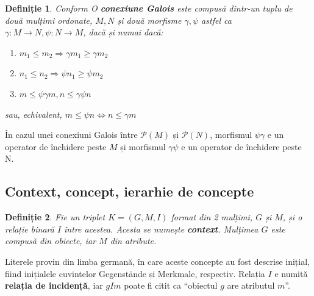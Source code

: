 \documentclass[12pt, a4paper, twoside, romanian]{teza-upb}
\newtheorem{defn}{Definiție}
\begin{document}
    \begin{defn}
      Conform \cite{Carpineto:2004:CDA:975252} O \textbf{conexiune Galois} este compusă dintr-un tuplu de două mulțimi ordonate, $M, N$ și două morfisme $\gamma, \psi$ astfel ca $ \gamma: M \rightarrow N, \psi : N \rightarrow M$, dacă și numai dacă:
    \begin{enumerate}
      \item $m_1 \le m_2 \Rightarrow  \gamma m_1 \ge \gamma m_2$
      \item $n_1 \le n_2 \Rightarrow \psi n_1 \ge \psi m_2$
      \item $m \le \psi \gamma m,  n \le \gamma\psi n $
    \end{enumerate}
    sau, echivalent, $m \le \psi n \Leftrightarrow n \le \gamma m$
    \end{defn}

    În cazul unei conexiuni Galois între $\mathcal{P}(M)$ și $\mathcal{P}(N)$, morfismul $\psi\gamma$ e un operator de închidere peste $M$ și morfismul $\gamma\psi$ e un operator de închidere peste N.

    \subsection{Context, concept, ierarhie de concepte}
    \begin{defn}
      Fie un triplet $K = (G, M, I)$ format din 2 mulțimi, $G$ și $M$, și o relație binară $I$ între acestea. Acesta se numește \textbf{context}. Mulțimea $G$ este compusă din obiecte, iar $M$ din atribute.
    \end{defn}

      Literele provin din limba germană, în care aceste concepte au fost descrise inițial, fiind inițialele cuvintelor Gegenstände și Merkmale, respectiv. Relația $I$ e numită \textbf{relația de incidență}, iar $gIm$ poate fi citit  ca ``obiectul $g$ are atributul $m$''.
\end{document}
